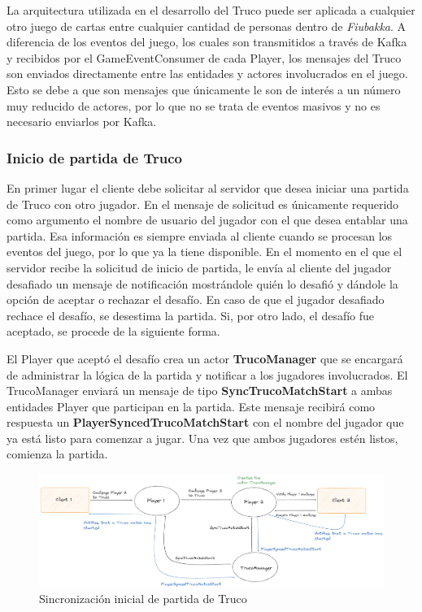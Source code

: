 La arquitectura utilizada en el desarrollo del Truco puede ser aplicada a cualquier otro juego de cartas entre cualquier cantidad de personas dentro de \textit{Fiubakka}.
A diferencia de los eventos del juego, los cuales son transmitidos a través de Kafka y recibidos por el GameEventConsumer de cada Player, los mensajes del Truco son enviados directamente entre las entidades
y actores involucrados en el juego. Esto se debe a que son mensajes que únicamente le son de interés a un número muy reducido de actores, por lo que no se trata de eventos masivos y no es necesario enviarlos por Kafka.

\subsubsection{Inicio de partida de Truco}

\noindent En primer lugar el cliente debe solicitar al servidor que desea iniciar una partida de Truco con otro jugador. En el mensaje de solicitud es únicamente requerido como argumento el nombre de usuario del jugador
con el que desea entablar una partida. Esa información es siempre enviada al cliente cuando se procesan los eventos del juego, por lo que ya la tiene disponible. En el momento en el que el servidor recibe la solicitud de inicio
de partida, le envía al cliente del jugador desafiado un mensaje de notificación mostrándole quién lo desafió y dándole la opción de aceptar o rechazar el desafío. En caso de que el jugador desafiado rechace el desafío,
se desestima la partida. Si, por otro lado, el desafío fue aceptado, se procede de la siguiente forma.

El Player que aceptó el desafío crea un actor \textbf{TrucoManager} que se encargará de administrar la lógica de la partida y notificar a los jugadores involucrados. El TrucoManager enviará un mensaje de tipo
\textbf{SyncTrucoMatchStart} a ambas entidades Player que participan en la partida. Este mensaje recibirá como respuesta un \textbf{PlayerSyncedTrucoMatchStart} con el nombre del jugador que ya está listo para comenzar a jugar.
Una vez que ambos jugadores estén listos, comienza la partida.

\newpage

\begin{figure}[htbp]
    \centering
    \includegraphics[width=1\textwidth]{../assets/truco-match-init.png}
    \caption{Sincronización inicial de partida de Truco}
\end{figure}

